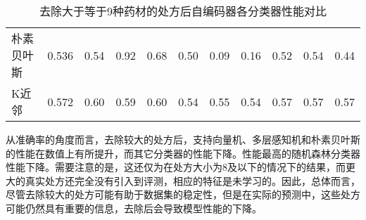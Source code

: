 \begin{table}[htbp]
{\begin{tabular}{lcccccccccc}
      朴素贝叶斯               & 0.536                & 0.54                    & 0.92                    & 0.68                      & 0.50 & 0.09 & 0.16 & 0.52 & 0.54 & 0.44 \\
      K近邻                 & 0.572                & 0.60                    & 0.59                    & 0.60                      & 0.54 & 0.55 & 0.54 & 0.57 & 0.57 & 0.57 \\
      \bottomrule
    \end{tabular}
  }
  \caption{去除大于等于9种药材的处方后自编码器各分类器性能对比}
  \label{tab:reduced_performance_comparison}
\end{table}

从准确率的角度而言，去除较大的处方后，支持向量机、多层感知机和朴素贝叶斯的性能在数值上有所提升，而其它分类器的性能下降。性能最高的随机森林分类器性能下降。需要注意的是，这还仅为在处方大小为8及以下的情况下的结果，而更大的真实处方还完全没有引入到评测，相应的特征是未学习的。因此，总体而言，尽管去除较大的处方可能有助于数据集的稳定性，但是在实际的预测中，这些处方可能仍然具有重要的信息，去除后会导致模型性能的下降。